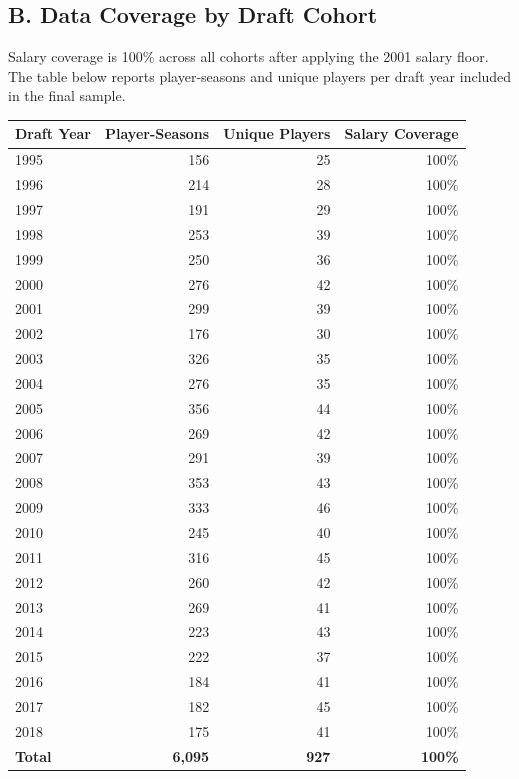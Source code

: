 \documentclass[12pt,letterpaper]{article}
\begin{document}
\subsection*{B. Data Coverage by Draft Cohort}

Salary coverage is 100\% across all cohorts after applying the 2001 salary floor. The table below reports player-seasons and unique players per draft year included in the final sample.

\begin{center}
\small
\begin{tabular}{@{}lrrr@{}}
\toprule
\textbf{Draft Year} & \textbf{Player-Seasons} & \textbf{Unique Players} & \textbf{Salary Coverage} \\
\midrule
1995 & 156 & 25 & 100\% \\
1996 & 214 & 28 & 100\% \\
1997 & 191 & 29 & 100\% \\
1998 & 253 & 39 & 100\% \\
1999 & 250 & 36 & 100\% \\
2000 & 276 & 42 & 100\% \\
2001 & 299 & 39 & 100\% \\
2002 & 176 & 30 & 100\% \\
2003 & 326 & 35 & 100\% \\
2004 & 276 & 35 & 100\% \\
2005 & 356 & 44 & 100\% \\
2006 & 269 & 42 & 100\% \\
2007 & 291 & 39 & 100\% \\
2008 & 353 & 43 & 100\% \\
2009 & 333 & 46 & 100\% \\
2010 & 245 & 40 & 100\% \\
2011 & 316 & 45 & 100\% \\
2012 & 260 & 42 & 100\% \\
2013 & 269 & 41 & 100\% \\
2014 & 223 & 43 & 100\% \\
2015 & 222 & 37 & 100\% \\
2016 & 184 & 41 & 100\% \\
2017 & 182 & 45 & 100\% \\
2018 & 175 & 41 & 100\% \\
\midrule
\textbf{Total} & \textbf{6,095} & \textbf{927} & \textbf{100\%} \\
\bottomrule
\end{tabular}
\end{center}
\end{document}

